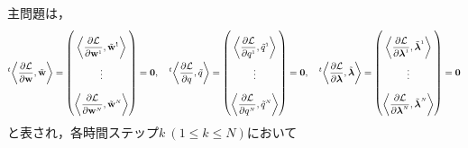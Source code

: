 \documentclass[a4paper,xelatex,ja=standard]{bxjsarticle}
\begin{document}
主問題は，
\begin{equation}
    \everymath{\displaystyle}
    \setlength{\arraycolsep}{0.5pt}
    \renewcommand{\arraystretch}{2.5}
    \label{eq:main_problem}
    {}^{t}\!\left\langle\frac{\partial \mathcal{L}}{\partial \mathbf{w}}, \tilde{\mathbf{w}}\right\rangle
    = \begin{pmatrix}
        \left\langle\frac{\partial \mathcal{L}}{\partial \mathbf{w}^{\scriptscriptstyle 1}}, \tilde{\mathbf{w}}^{\scriptscriptstyle 1}\right\rangle \\
        \vdots \\
        \left\langle\frac{\partial \mathcal{L}}{\partial \mathbf{w}^{\scriptscriptstyle N}}, \tilde{\mathbf{w}}^{\scriptscriptstyle N}\right\rangle 
    \end{pmatrix}
    =\mathbf{0}
    ,\quad
    {}^{t}\!\left\langle\frac{\partial \mathcal{L}}{\partial q}, \tilde{q}\right\rangle
    = \begin{pmatrix}
        \left\langle\frac{\partial \mathcal{L}}{\partial q^{\scriptscriptstyle 1}}, \tilde{q}^{\scriptscriptstyle 1}\right\rangle \\
        \vdots \\
        \left\langle\frac{\partial \mathcal{L}}{\partial q^{\scriptscriptstyle N}}, \tilde{q}^{\scriptscriptstyle N}\right\rangle 
    \end{pmatrix}
    =\mathbf{0}
    ,\quad
    {}^{t}\!\left\langle\frac{\partial \mathcal{L}}{\partial \boldsymbol{\lambda}}, \tilde{\boldsymbol{\lambda}}\right\rangle
    = \begin{pmatrix}
        \left\langle\frac{\partial \mathcal{L}}{\partial \boldsymbol{\lambda}^{\scriptscriptstyle 1}}, \tilde{\boldsymbol{\lambda}}^{\scriptscriptstyle 1}\right\rangle \\
        \vdots \\
        \left\langle\frac{\partial \mathcal{L}}{\partial \boldsymbol{\lambda}^{\scriptscriptstyle N}}, \tilde{\boldsymbol{\lambda}}^{\scriptscriptstyle N}\right\rangle 
    \end{pmatrix}
    =\mathbf{0}
\end{equation}
と表され，各時間ステップ$k \ (1 \leq k \leq N)$において
\end{document}
